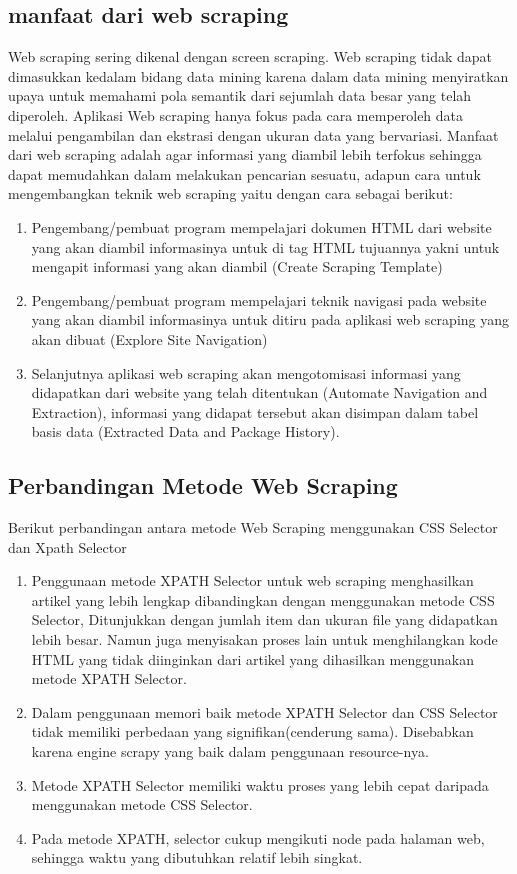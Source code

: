 \documentclass[12pt, a4paper]{article}
\begin{document}
\subsection{manfaat dari web scraping}
Web scraping sering dikenal dengan screen scraping. Web scraping tidak dapat dimasukkan kedalam bidang data
mining karena dalam data mining menyiratkan upaya untuk memahami pola semantik dari sejumlah data besar yang
telah diperoleh. Aplikasi Web scraping hanya fokus pada cara memperoleh data melalui pengambilan dan ekstrasi
dengan ukuran data yang bervariasi. Manfaat dari web scraping adalah agar informasi yang diambil lebih
terfokus sehingga dapat memudahkan dalam melakukan pencarian sesuatu, adapun cara untuk mengembangkan teknik
web scraping yaitu dengan cara sebagai berikut:
\begin{enumerate}
\item Pengembang/pembuat program mempelajari dokumen HTML dari website yang akan diambil informasinya untuk
	  di tag HTML tujuannya yakni untuk mengapit informasi yang akan diambil (Create Scraping Template)
\item Pengembang/pembuat program mempelajari teknik navigasi pada website yang akan diambil informasinya
	   untuk ditiru pada aplikasi web scraping yang akan dibuat (Explore Site Navigation)
\item Selanjutnya aplikasi web scraping akan mengotomisasi informasi yang didapatkan dari website yang telah
	   ditentukan (Automate Navigation and Extraction), informasi yang didapat tersebut akan disimpan dalam 
	   tabel basis data (Extracted Data and Package History).
\end{enumerate}

\subsection{Perbandingan Metode Web Scraping}
Berikut perbandingan antara metode Web Scraping menggunakan CSS Selector dan Xpath Selector
\begin{enumerate}
\item Penggunaan metode XPATH Selector untuk web scraping menghasilkan artikel yang lebih lengkap
	  dibandingkan dengan menggunakan metode CSS Selector, Ditunjukkan dengan jumlah item dan ukuran file
	  yang didapatkan lebih besar. Namun juga menyisakan proses lain untuk menghilangkan kode HTML yang tidak
	  diinginkan dari artikel yang dihasilkan menggunakan metode XPATH Selector.
\item Dalam penggunaan memori baik metode XPATH Selector dan CSS Selector tidak memiliki perbedaan yang
	  signifikan(cenderung sama). Disebabkan karena engine scrapy yang baik dalam penggunaan resource-nya. 
\item Metode XPATH Selector memiliki waktu proses yang lebih cepat daripada menggunakan metode CSS Selector.
\item Pada metode XPATH, selector cukup mengikuti node pada halaman web, sehingga waktu yang dibutuhkan
	  relatif lebih singkat.
\end{enumerate}
\end{document}
